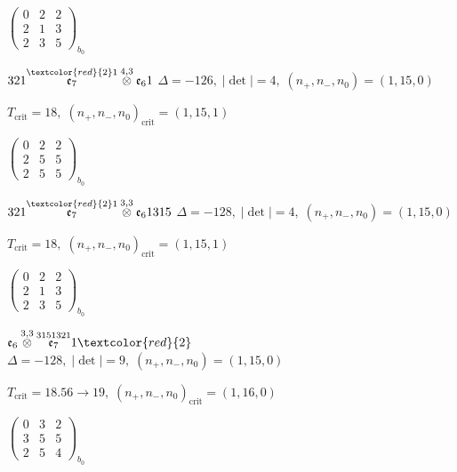 \documentclass[10pt]{article}
\begin{document}
\hspace{2em}$\left(\begin{smallmatrix}0 & 2 & 2 \\ 2 & 1 & 3 \\ 2 & 3 & 5\end{smallmatrix}\right)_{\!b_0}$

\smallskip

$321\overset{\textcolor{red}{2}1}{\mathfrak{e}_7}\overset{4,3}{\otimes}\mathfrak{e}_61$ \quad $\Delta=-126,\; |\det|=4,\; (n_+,n_-,n_0)=(1,15,0)$

\hspace{1em}$T_{\text{crit}}=18,\; (n_+,n_-,n_0)_{\text{crit}}=(1,15,1)$

\hspace{2em}$\left(\begin{smallmatrix}0 & 2 & 2 \\ 2 & 5 & 5 \\ 2 & 5 & 5\end{smallmatrix}\right)_{\!b_0}$

\smallskip

$321\overset{\textcolor{red}{2}1}{\mathfrak{e}_7}\overset{3,3}{\otimes}\mathfrak{e}_61315$ \quad $\Delta=-128,\; |\det|=4,\; (n_+,n_-,n_0)=(1,15,0)$

\hspace{1em}$T_{\text{crit}}=18,\; (n_+,n_-,n_0)_{\text{crit}}=(1,15,1)$

\hspace{2em}$\left(\begin{smallmatrix}0 & 2 & 2 \\ 2 & 1 & 3 \\ 2 & 3 & 5\end{smallmatrix}\right)_{\!b_0}$

\smallskip

$\mathfrak{e}_6\overset{3,3}{\otimes}\overset{3151321}{\mathfrak{e}_7}1\textcolor{red}{2}$ \quad $\Delta=-128,\; |\det|=9,\; (n_+,n_-,n_0)=(1,15,0)$

\hspace{1em}$T_{\text{crit}}=18.56 \to 19,\; (n_+,n_-,n_0)_{\text{crit}}=(1,16,0)$

\hspace{2em}$\left(\begin{smallmatrix}0 & 3 & 2 \\ 3 & 5 & 5 \\ 2 & 5 & 4\end{smallmatrix}\right)_{\!b_0}$
\end{document}
